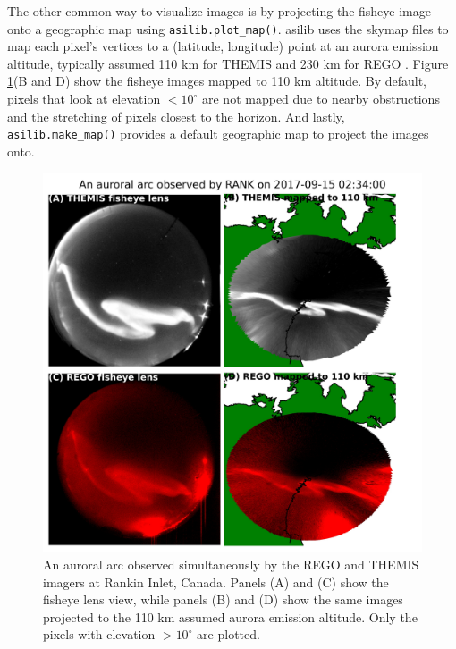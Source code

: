 \documentclass[utf8]{FrontiersinHarvard} %
\begin{document}
The other common way to visualize images is by projecting the fisheye image onto a geographic map using \verb|asilib.plot_map()|. asilib uses the skymap files to map each pixel's vertices to a (latitude, longitude) point at an aurora emission altitude, typically assumed 110 km for THEMIS and 230 km for REGO \citep{Donovan2006b, Liang2016}. Figure \ref{fig2}(B and D) show the fisheye images mapped to 110 km altitude. By default, pixels that look at elevation $< 10^\circ$ are not mapped due to nearby obstructions and the stretching of pixels closest to the horizon. And lastly, \verb|asilib.make_map()| provides a default geographic map to project the images onto.

\begin{figure}
      \includegraphics[width=\textwidth]{figures/fig2.jpg}
      \caption{An auroral arc observed simultaneously by the REGO and THEMIS imagers at Rankin Inlet, Canada. Panels (A) and (C) show the fisheye lens view, while panels (B) and (D) show the same images projected to the 110 km assumed aurora emission altitude. Only the pixels with elevation $>10^\circ$ are plotted.}
      \label{fig2}
\end{figure}
\end{document}
